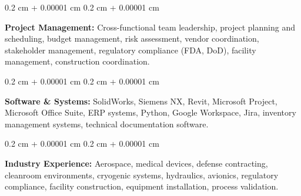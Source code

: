 \documentclass[10pt, letterpaper]{article}
\newenvironment{onecolentry}{
    \begin{adjustwidth}{
        0.2 cm + 0.00001 cm
    }{
        0.2 cm + 0.00001 cm
    }
}{
    \end{adjustwidth}
} %
\begin{document}
        \vspace{0.2 cm}

        \begin{onecolentry}
            \textbf{Project Management:} Cross-functional team leadership, project planning and scheduling, budget management, risk assessment, vendor coordination, stakeholder management, regulatory compliance (FDA, DoD), facility management, construction coordination.
        \end{onecolentry}

        \vspace{0.2 cm}

        \begin{onecolentry}
            \textbf{Software \& Systems:} SolidWorks, Siemens NX, Revit, Microsoft Project, Microsoft Office Suite, ERP systems, Python, Google Workspace, Jira, inventory management systems, technical documentation software.
        \end{onecolentry}

        \vspace{0.2 cm}

        \begin{onecolentry}
            \textbf{Industry Experience:} Aerospace, medical devices, defense contracting, cleanroom environments, cryogenic systems, hydraulics, avionics, regulatory compliance, facility construction, equipment installation, process validation.
        \end{onecolentry}


    
\end{document}
